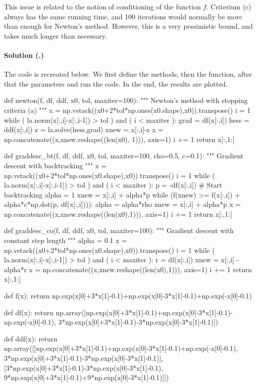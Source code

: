 \documentclass{article}
\newcounter{problemSheetNumber}
\newcounter{problems}
\renewcommand{\solution}[1]{\paragraph{Solution (\theproblemSheetNumber.\theproblems)}\addtocounter{problems}{1}\label{#1}}
\begin{document}
This issue is related to the notion of conditioning of the function $f$. Criterium (c) always has the same running time, and 100 iterations would normally be more than enough for Newton's method. However, this is a very pessimistic bound, and takes much longer than necessary.

\solution{pr:2} The code is recreated below. We first define the methods, then the function, after that the parameters and run the code. In the end, the results are plotted.

\begin{ipythonnb}
def newton(f, df, ddf, x0, tol, maxiter=100):
    """
    Newton's method with stopping criteria (a)
    """
    x = np.vstack((x0+2*tol*np.ones(x0.shape),x0)).transpose()
    i = 1
    while ( la.norm(x[:,i]-x[:,i-1]) > tol ) and ( i < maxiter ):
        grad = df(x[:,i])
        hess = ddf(x[:,i])
        z = la.solve(hess,grad)
        xnew = x[:,i]-z
        x = np.concatenate((x,xnew.reshape((len(x0), 1))), axis=1)
        i += 1
    return x[:,1:]

def graddesc_bt(f, df, ddf, x0, tol, maxiter=100, rho=0.5, c=0.1):
    """
    Gradient descent with backtracking
    """
    x = np.vstack((x0+2*tol*np.ones(x0.shape),x0)).transpose()
    i = 1
    while ( la.norm(x[:,i]-x[:,i-1]) > tol ) and ( i < maxiter ):
        p = -df(x[:,i])
        # Start backtracking
        alpha = 1
        xnew = x[:,i] + alpha*p
        while (f(xnew) >= f(x[:,i]) + alpha*c*np.dot(p, df(x[:,i]))):
            alpha = alpha*rho
            xnew = x[:,i] + alpha*p
        x = np.concatenate((x,xnew.reshape((len(x0),1))), axis=1)
        i += 1
    return x[:,1:]

def graddesc_co(f, df, ddf, x0, tol, maxiter=100):
    """
    Gradient descent with constant step length
    """
    alpha = 0.1
    x = np.vstack((x0+2*tol*np.ones(x0.shape),x0)).transpose()
    i = 1
    while ( la.norm(x[:,i]-x[:,i-1]) > tol ) and ( i < maxiter ):
        r = df(x[:,i])
        xnew = x[:,i] - alpha*r
        x = np.concatenate((x,xnew.reshape((len(x0),1))), axis=1)
        i += 1
    return x[:,1:]
\end{ipythonnb}

\begin{ipythonnb}
def f(x):
    return np.exp(x[0]+3*x[1]-0.1)+np.exp(x[0]-3*x[1]-0.1)+np.exp(-x[0]-0.1)

def df(x):
    return np.array([np.exp(x[0]+3*x[1]-0.1)+np.exp(x[0]-3*x[1]-0.1)-np.exp(-x[0]-0.1), 
                     3*np.exp(x[0]+3*x[1]-0.1)-3*np.exp(x[0]-3*x[1]-0.1)])

def ddf(x):
    return np.array([[np.exp(x[0]+3*x[1]-0.1)+np.exp(x[0]-3*x[1]-0.1)+np.exp(-x[0]-0.1), 
                     3*np.exp(x[0]+3*x[1]-0.1)-3*np.exp(x[0]-3*x[1]-0.1)], 
                     [3*np.exp(x[0]+3*x[1]-0.1)-3*np.exp(x[0]-3*x[1]-0.1),
                    9*np.exp(x[0]+3*x[1]-0.1)+9*np.exp(x[0]-3*x[1]-0.1)]])
\end{ipythonnb}
\end{document}
